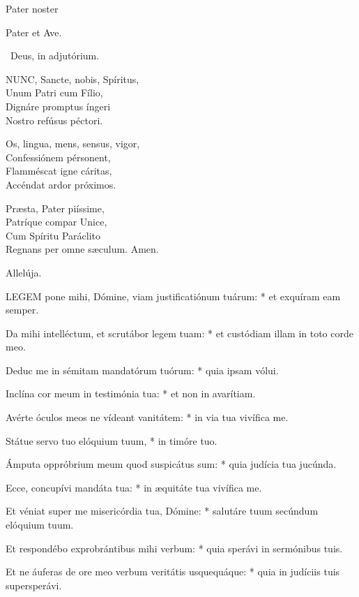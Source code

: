  Pater noster 


Pater et Ave.

\V\ Deus, in adjutórium.


\lettrine[lines=2]{N}{UNC}, Sancte, nobis, Spíritus,\\
Unum Patri cum Fílio,\\
Dignáre promptus íngeri\\
Nostro refúsus péctori.

Os, lingua, mens, sensus, vigor,\\
Confessiónem pérsonent,\\
Flamméscat igne cáritas,\\
Accéndat ardor próximos.

Præsta, Pater piíssime,\\
Patríque compar Unice,\\
Cum Spíritu Paráclito\\
Regnans per omne sæculum. Amen.

 Allelúja.


\lettrine[lines=2]{L}{EGEM} pone mihi, Dómine, viam justificatiónum tuárum: * et exquíram eam semper.

Da mihi intelléctum, et scrutábor legem tuam: * et custódiam illam in toto corde meo.

Deduc me in sémitam mandatórum tuórum: * quia ipsam vólui.

Inclína cor meum in testimónia tua: * et non in avarítiam.

Avérte óculos meos ne vídeant vanitátem: * in via tua vivífica me.

Státue servo tuo elóquium tuum, * in timóre tuo.

Ámputa oppróbrium meum quod suspicátus sum: * quia judícia tua jucúnda.

Ecce, concupívi mandáta tua: * in æquitáte tua vivífica me.

Et véniat super me misericórdia tua, Dómine: * salutáre tuum secúndum elóquium tuum.

Et respondébo exprobrántibus mihi verbum: * quia sperávi in sermónibus tuis.

Et ne áuferas de ore meo verbum veritátis usquequáque: * quia in judíciis tuis supersperávi.

